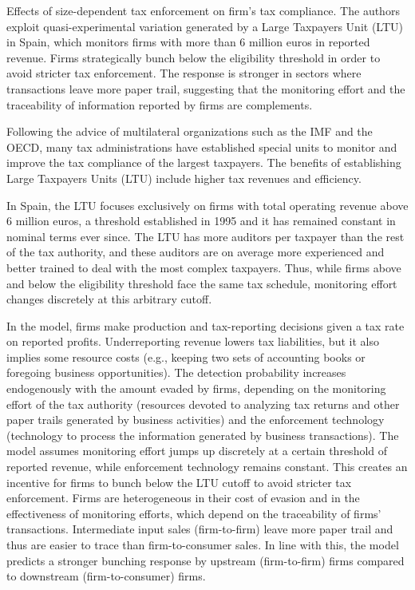 \documentclass[
  12pt]{article}
\theoremstyle{definition}
\theoremstyle{remark}
\begin{document}
Effects of size-dependent tax enforcement on firm's tax compliance. The
authors exploit quasi-experimental variation generated by a Large
Taxpayers Unit (LTU) in Spain, which monitors firms with more than 6
million euros in reported revenue. Firms strategically bunch below the
eligibility threshold in order to avoid stricter tax enforcement. The
response is stronger in sectors where transactions leave more paper
trail, suggesting that the monitoring effort and the traceability of
information reported by firms are complements.

Following the advice of multilateral organizations such as the IMF and
the OECD, many tax administrations have established special units to
monitor and improve the tax compliance of the largest taxpayers. The
benefits of establishing Large Taxpayers Units (LTU) include higher tax
revenues and efficiency.

In Spain, the LTU focuses exclusively on firms with total operating
revenue above 6 million euros, a threshold established in 1995 and it
has remained constant in nominal terms ever since. The LTU has more
auditors per taxpayer than the rest of the tax authority, and these
auditors are on average more experienced and better trained to deal with
the most complex taxpayers. Thus, while firms above and below the
eligibility threshold face the same tax schedule, monitoring effort
changes discretely at this arbitrary cutoff.

In the model, firms make production and tax-reporting decisions given a
tax rate on reported profits. Underreporting revenue lowers tax
liabilities, but it also implies some resource costs (e.g., keeping two
sets of accounting books or foregoing business opportunities). The
detection probability increases endogenously with the amount evaded by
firms, depending on the monitoring effort of the tax authority
(resources devoted to analyzing tax returns and other paper trails
generated by business activities) and the enforcement technology
(technology to process the information generated by business
transactions). The model assumes monitoring effort jumps up discretely
at a certain threshold of reported revenue, while enforcement technology
remains constant. This creates an incentive for firms to bunch below the
LTU cutoff to avoid stricter tax enforcement. Firms are heterogeneous in
their cost of evasion and in the effectiveness of monitoring efforts,
which depend on the traceability of firms' transactions. Intermediate
input sales (firm-to-firm) leave more paper trail and thus are easier to
trace than firm-to-consumer sales. In line with this, the model predicts
a stronger bunching response by upstream (firm-to-firm) firms compared
to downstream (firm-to-consumer) firms.
\end{document}
